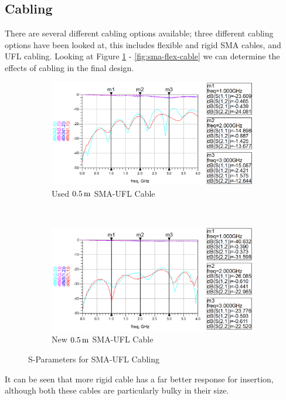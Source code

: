 \documentclass[12pt,openany,a4paper]{book}
\newcommand{\m}		{\ensuremath{\rm\,m}}
\begin{document}
\subsection{Cabling}		\label{sec:res_cabling}
There are several different cabling options available; three different cabling options have been looked at, this includes flexible and rigid SMA cables, and UFL cabling. Looking at Figure \ref{fig:sma-ufl-cable} - \ref{fig:sma-flex-cable} we can determine the effects of cabling in the final design.
\begin{figure}[H]
    \centering
    \begin{subfigure}[t]{0.5\textwidth}
        \centering
        \includegraphics[width=1\textwidth]{sma-bad.png}
        \caption{Used $0.5\m$ SMA-UFL Cable}
        \label{fig:sma-ufl-cable}
    \end{subfigure}%
    ~ 
    \begin{subfigure}[t]{0.5\textwidth}
        \centering
        \includegraphics[width=1\textwidth]{sma-good.png}
        \caption{New $0.5\m$ SMA-UFL Cable}
    \end{subfigure}
    \caption{S-Parameters for SMA-UFL Cabling}
\end{figure}
It can be seen that more rigid cable has a far better response for insertion, although both these cables are particularly bulky in their size. 
\end{document}
